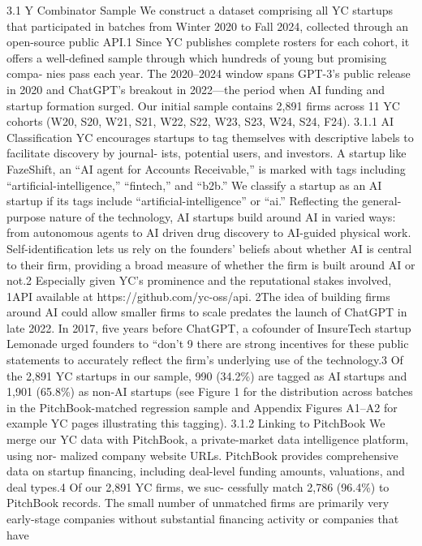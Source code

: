 3.1
Y Combinator Sample
We construct a dataset comprising all YC startups that participated in batches from Winter 2020
to Fall 2024, collected through an open-source public API.1 Since YC publishes complete rosters for
each cohort, it offers a well-defined sample through which hundreds of young but promising compa-
nies pass each year. The 2020–2024 window spans GPT-3’s public release in 2020 and ChatGPT’s
breakout in 2022—the period when AI funding and startup formation surged. Our initial sample
contains 2,891 firms across 11 YC cohorts (W20, S20, W21, S21, W22, S22, W23, S23, W24, S24,
F24).
3.1.1
AI Classification
YC encourages startups to tag themselves with descriptive labels to facilitate discovery by journal-
ists, potential users, and investors. A startup like FazeShift, an “AI agent for Accounts Receivable,”
is marked with tags including “artificial-intelligence,” “fintech,” and “b2b.” We classify a startup
as an AI startup if its tags include “artificial-intelligence” or “ai.” Reflecting the general-purpose
nature of the technology, AI startups build around AI in varied ways: from autonomous agents to
AI driven drug discovery to AI-guided physical work. Self-identification lets us rely on the founders’
beliefs about whether AI is central to their firm, providing a broad measure of whether the firm is
built around AI or not.2 Especially given YC’s prominence and the reputational stakes involved,
1API available at https://github.com/yc-oss/api.
2The idea of building firms around AI could allow smaller firms to scale predates the launch of ChatGPT in late
2022. In 2017, five years before ChatGPT, a cofounder of InsureTech startup Lemonade urged founders to “don’t
9
there are strong incentives for these public statements to accurately reflect the firm’s underlying
use of the technology.3 Of the 2,891 YC startups in our sample, 990 (34.2\%) are tagged as AI
startups and 1,901 (65.8\%) as non-AI startups (see Figure 1 for the distribution across batches
in the PitchBook-matched regression sample and Appendix Figures A1–A2 for example YC pages
illustrating this tagging).
3.1.2
Linking to PitchBook
We merge our YC data with PitchBook, a private-market data intelligence platform, using nor-
malized company website URLs.
PitchBook provides comprehensive data on startup financing,
including deal-level funding amounts, valuations, and deal types.4 Of our 2,891 YC firms, we suc-
cessfully match 2,786 (96.4\%) to PitchBook records. The small number of unmatched firms are
primarily very early-stage companies without substantial financing activity or companies that have
